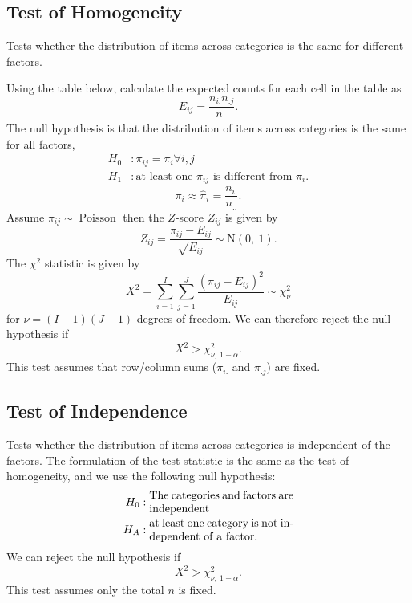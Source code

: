 \documentclass{article}
\begin{document}
\begin{multicols}{3}
\subsection{Test of Homogeneity}
Tests whether the distribution
of items across categories is the same for different factors.

Using the table below,
calculate the expected counts for each cell in the table as
\begin{equation*}
    E_{ij} = \frac{n_{i.} n_{.j}}{n_{..}}.
\end{equation*}
The null hypothesis is that the distribution of items across
categories is the same for all factors,
\begin{align*}
    H_0 & : \pi_{ij} = \pi_{i} \forall i, j \\
    H_1 & : \text{at least one \(\pi_{ij}\) is different from \(\pi_{i}\)}.
\end{align*}
\begin{equation*}
    \pi_i \approx \hat{\pi}_i = \frac{n_{i.}}{n_{..}}.
\end{equation*}
Assume \(\pi_{ij} \sim \operatorname{Poisson}\)
then the \(Z\)-score \(Z_{ij}\) is given by
\begin{equation*}
    Z_{ij} = \frac{\pi_{ij} - E_{ij}}{\sqrt{E_{ij}}} \sim \mathrm{N}\left( 0,\: 1 \right).
\end{equation*}
The \(\chi^2\) statistic is given by
\begin{equation*}
    X^2 = \sum_{i = 1}^I \sum_{j = 1}^J \frac{\left( \pi_{ij} - E_{ij} \right)^2}{E_{ij}} \sim \chi_{\nu}^2
\end{equation*}
for \(\nu = \left( I - 1 \right)\left( J - 1 \right)\) degrees of freedom. We can therefore reject the null hypothesis if
\begin{equation*}
    X^2 > \chi_{\nu, \: 1 - \alpha}^2.
\end{equation*}
This test assumes that row/column sums (\(\pi_{i.}\) and \(\pi_{.j}\)) are fixed.
\subsection{Test of Independence}
Tests whether the distribution of items across categories is independent of the
factors. The formulation of the test statistic is the same as the test of homogeneity, and we use the following
null hypothesis:
\begin{align*}
    H_0 & : \text{\parbox{4.5cm}{The categories and factors are independent}}            \\
    H_A & : \text{\parbox{4.5cm}{at least one category is not independent of a factor.}}
\end{align*}
We can reject the null hypothesis if
\begin{equation*}
    X^2 > \chi_{\nu, \: 1 - \alpha}^2.
\end{equation*}
This test assumes only the total \(n\) is fixed.
\end{multicols}
\end{document}
